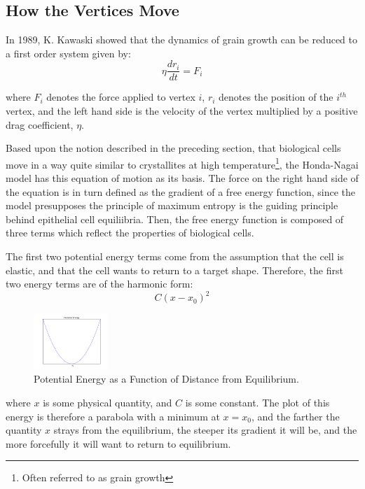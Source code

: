 \subsection{How the Vertices Move}
In 1989, K. Kawaski showed that the dynamics of grain growth can be reduced to a first order system given by:
\begin{equation}
\eta\frac{dr_i}{dt} = F_i
\end{equation}

where $F_i$ denotes the force applied to vertex $i$, $r_i$ denotes the position of the $i^{th}$ vertex,  and the left hand side is the velocity of the vertex multiplied by a positive drag coefficient, $\eta$\cite{1989Kawasaki}.

Based upon the notion described in the preceding section, that biological cells move in a way quite similar to crystallites at high temperature\footnote{Often referred to as grain growth}, the Honda-Nagai model has this equation of motion as its basis. The force on the right hand side of the equation is in turn defined as the gradient of a free energy function, since the model presupposes the principle of maximum entropy is the guiding principle behind epithelial cell equiliibria. Then, the free energy function is composed of three terms which reflect the properties of biological cells.

The first two potential energy terms come from the assumption that the cell is elastic, and that the cell wants to return to a target shape. Therefore, the first two energy terms are of the harmonic form: 
\begin{equation}
C(x-x_0)^2
\end{equation}
\begin{figure}
\centering
\includegraphics[width=0.25\textwidth]{../diagrams/parabola.png}
\caption{Potential Energy as a Function of Distance from Equilibrium.}
\label{fig:pe}
\end{figure}
where $x$ is some physical quantity, and $C$ is some constant. The plot of this energy is therefore a parabola with a minimum at $x =  x_0$, and the farther the quantity $x$ strays from the equilibrium, the steeper its gradient it will be, and the more forcefully it will want to return to equilibrium. 

